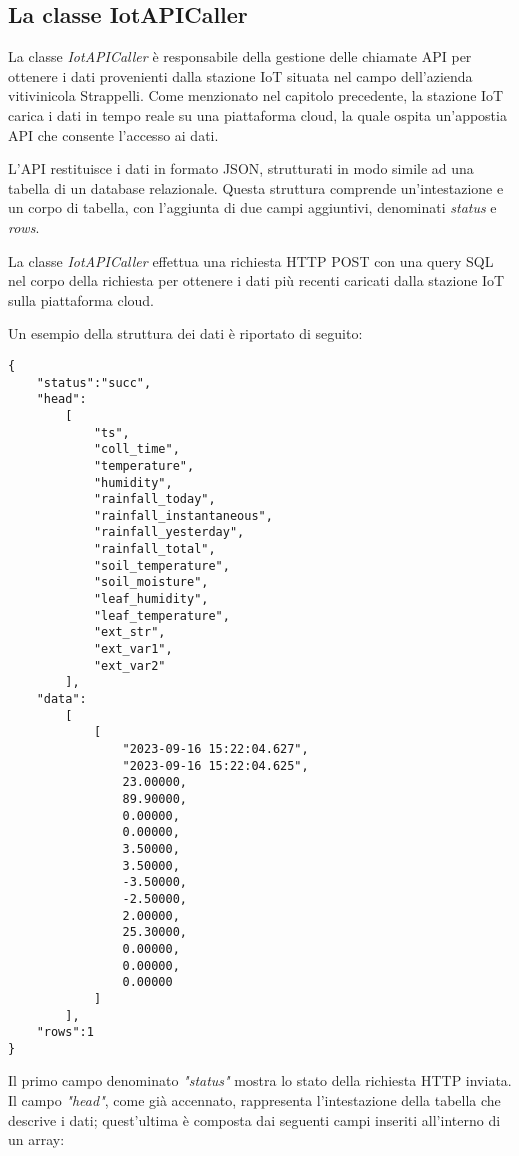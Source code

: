 \subsection{La classe IotAPICaller}

La classe \textit{IotAPICaller} è responsabile della gestione delle chiamate API per ottenere i dati provenienti dalla stazione IoT situata nel campo dell'azienda vitivinicola Strappelli. Come menzionato nel capitolo precedente, la stazione IoT carica i dati in tempo reale su una piattaforma cloud, la quale ospita un'appostia API che consente l'accesso ai dati.

L'API restituisce i dati in formato JSON, strutturati in modo simile ad una tabella di un database relazionale. Questa struttura comprende un'intestazione e un corpo di tabella, con l'aggiunta di due campi aggiuntivi, denominati \textit{status} e \textit{rows}.

La classe \textit{IotAPICaller} effettua una richiesta HTTP POST con una query SQL nel corpo della richiesta per ottenere i dati più recenti caricati dalla stazione IoT sulla piattaforma cloud.

Un esempio della struttura dei dati è riportato di seguito:

\begin{lstlisting}[caption=File JSON restituito dall'API della stazione IoT, label=lst:iotjson, captionpos=b]
 {
    "status":"succ",
    "head":
        [
            "ts",
            "coll_time",
            "temperature",
            "humidity",
            "rainfall_today",
            "rainfall_instantaneous",
            "rainfall_yesterday",
            "rainfall_total",
            "soil_temperature",
            "soil_moisture",
            "leaf_humidity",
            "leaf_temperature",
            "ext_str",
            "ext_var1",
            "ext_var2"
        ],
    "data":
        [
            [
                "2023-09-16 15:22:04.627",
                "2023-09-16 15:22:04.625",
                23.00000,
                89.90000,
                0.00000,
                0.00000,
                3.50000,
                3.50000,
                -3.50000,
                -2.50000,
                2.00000,
                25.30000,
                0.00000,
                0.00000,
                0.00000
            ]
        ],
    "rows":1
}
\end{lstlisting}

Il primo campo denominato \textit{"status"} mostra lo stato della richiesta HTTP inviata.
Il campo \textit{"head"}, come già accennato, rappresenta l'intestazione della tabella che descrive i dati; quest'ultima è composta dai seguenti campi inseriti all'interno di un array:

